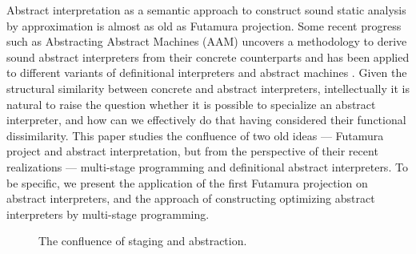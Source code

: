 Abstract interpretation \cite{DBLP:conf/popl/CousotC77} as a semantic approach to construct 
sound static analysis by approximation is almost as old as Futamura projection.
Some recent progress such as Abstracting Abstract Machines (AAM) uncovers a methodology to 
derive sound abstract interpreters from their concrete counterparts and has been applied to 
different variants of definitional interpreters and abstract machines
\cite{DBLP:journals/jfp/HornM12, DBLP:conf/icfp/HornM10, DBLP:journals/pacmpl/DaraisLNH17}.
Given the structural similarity between concrete and abstract interpreters, intellectually 
it is natural to raise the question whether it is possible to specialize an abstract interpreter, and how 
can we effectively do that having considered their functional dissimilarity. 
This paper studies the confluence of two old ideas --- Futamura project and abstract interpretation,
but from the perspective of their recent realizations --- multi-stage programming and definitional
abstract interpreters. To be specific, we present the application of the first Futamura projection
on abstract interpreters, and the approach of constructing optimizing abstract interpreters by 
multi-stage programming.

\begin{figure}[h]
  \caption{The confluence of staging and abstraction.}
\end{figure}

